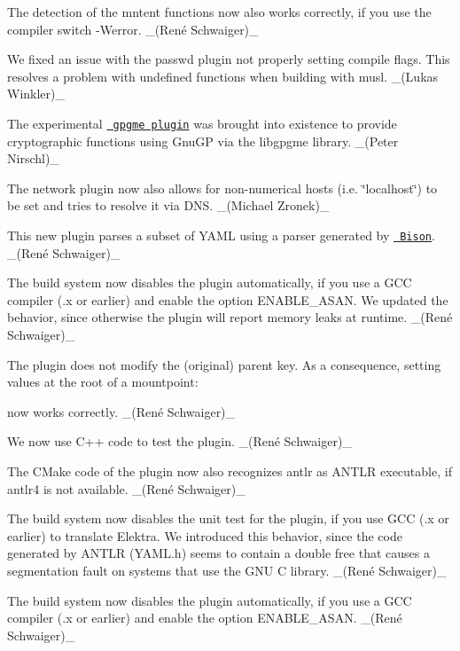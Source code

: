 The detection of the {\ttfamily mntent} functions now also works correctly, if you use the compiler switch {\ttfamily -\/Werror}. \+\_\+(René Schwaiger)\+\_\+

We fixed an issue with the passwd plugin not properly setting compile flags. This resolves a problem with undefined functions when building with musl. \+\_\+(\+Lukas Winkler)\+\_\+

The experimental \href{https://libelektra.org/plugins/gpgme}{\texttt{ gpgme plugin}} was brought into existence to provide cryptographic functions using Gnu\+GP via the {\ttfamily libgpgme} library. \+\_\+(\+Peter Nirschl)\+\_\+

The {\ttfamily network} plugin now also allows for non-\/numerical hosts (i.\+e. \char`\"{}localhost\char`\"{}) to be set and tries to resolve it via D\+NS. \+\_\+(\+Michael Zronek)\+\_\+

This new plugin parses a subset of Y\+A\+ML using a parser generated by \href{https://www.gnu.org/software/bison}{\texttt{ Bison}}. \+\_\+(René Schwaiger)\+\_\+

The build system now disables the plugin automatically, if you use a G\+CC compiler ({.\+x} or earlier) and enable the option {\ttfamily E\+N\+A\+B\+L\+E\+\_\+\+A\+S\+AN}. We updated the behavior, since otherwise the plugin will report memory leaks at runtime. \+\_\+(René Schwaiger)\+\_\+


\begin{DoxyItemize}
\item The plugin does not modify the (original) parent key. As a consequence, setting values at the root of a mountpoint\+:
\end{DoxyItemize}


\begin{DoxyCode}{0}
\end{DoxyCode}


now works correctly. \+\_\+(René Schwaiger)\+\_\+


\begin{DoxyItemize}
\item We now use C++ code to test the plugin. \+\_\+(René Schwaiger)\+\_\+
\item The C\+Make code of the plugin now also recognizes {\ttfamily antlr} as A\+N\+T\+LR executable, if {\ttfamily antlr4} is not available. \+\_\+(René Schwaiger)\+\_\+
\item The build system now disables the unit test for the plugin, if you use G\+CC ({.\+x} or earlier) to translate Elektra. We introduced this behavior, since the code generated by A\+N\+T\+LR ({\ttfamily Y\+A\+M\+L.\+h}) seems to contain a double free that causes a segmentation fault on systems that use the G\+NU C library. \+\_\+(René Schwaiger)\+\_\+
\item The build system now disables the plugin automatically, if you use a G\+CC compiler ({.\+x} or earlier) and enable the option {\ttfamily E\+N\+A\+B\+L\+E\+\_\+\+A\+S\+AN}. \+\_\+(René Schwaiger)\+\_\+
\end{DoxyItemize}

